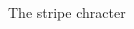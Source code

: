 \begin{figure}[H]
{\begin{adjustbox}{width=6cm,center}
\begin{tikzpicture}
          \end{tikzpicture}
        \end{adjustbox}
      }\caption*{The stripe chracter}
    \end{figure}
    
